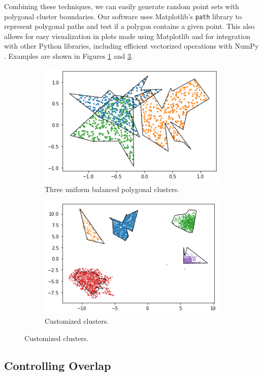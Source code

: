 \documentclass[manuscript,screen,review]{acmart}
\begin{document}
Combining these techniques, we can easily generate random point sets with polygonal cluster boundaries. Our software uses Matplotlib's \texttt{path} library \cite{matplotlib} to represent polygonal paths and test if a polygon contains a given point. This also allows for easy visualization in plots made using Matplotlib and for integration with other Python libraries, including efficient vectorized operations with NumPy \cite{numpy}.
Examples are shown in Figures \ref{fig:make-poly} and \ref{fig:make-poly-diff}.
\begin{figure}[ht]
    \centering
    \parbox{.45\textwidth}{
        \begin{subfigure}
            \centering
            \includegraphics[width=.4\textwidth]{images/polygon_points.png}
            \caption{Three uniform balanced polygonal clusters.}
            \label{fig:make-poly}
        \end{subfigure}
    }
    \parbox{.45\textwidth}{
        \begin{subfigure}
            \centering
            \includegraphics[width=.4\textwidth]{images/poly_diff.png}
            \caption{Customized clusters.}
            \label{fig:make-poly-diff}
        \end{subfigure}
    }
\end{figure}

\subsection{Controlling Overlap}
\end{document}
